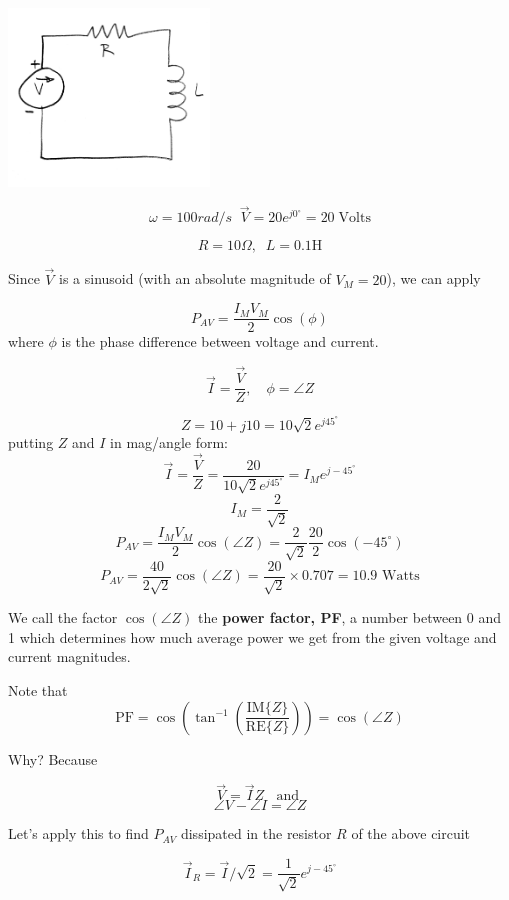 \includegraphics[width=0.4\textwidth]{figsChapt03/TU95372.png}


\[
\omega = 100 rad/s\;\; \vec{V} = 20 e^{j 0^\circ} = 20\; \mathrm{Volts}
\]

\[
R = 10 \Omega,\;\; L = 0.1 \text{H}
\]

\noindent Since $\vec V$ is a sinusoid (with an absolute magnitude of
$V_M=20$), we can apply

\[
P_{AV} = \frac{I_M V_M}{2} \cos(\phi)
\]
where $\phi$ is the phase difference between voltage  and current.

\[
\vec{I} = \frac{\vec{V}}{Z},  \quad \phi = \angle{Z}
\]

\[
Z = 10 + j10 = 10\sqrt{2}e^{j45^\circ}
\]
putting $Z$ and $I$ in mag/angle form:
\[
\vec{I} = \frac{\vec V}{Z} = \frac{20}{10\sqrt{2} e^{j45^\circ}} = I_M e^{j-45^\circ}
\]
\[\boxed{
    I_M=\frac{2}{\sqrt{2}}
  }
\]
\[
P_{AV} = \frac{I_M V_M}{2} \cos(\angle Z) = \frac {2}  {\sqrt{2}} \frac {20}  {2}\cos(-45^\circ)
\]
\[\boxed{
    P_{AV} = \frac {40}  {2\sqrt{2}}\cos(\angle Z)  =  \frac {20}  {\sqrt{2}}\times 0.707 = 10.9 \text{ Watts}
    }
\]


We call the factor $\cos(\angle Z)$ the {\bf power factor, PF}, a number
between 0 and 1 which determines how much average power we get from the
given voltage and current magnitudes.

Note that
\[
\mathrm{PF} = \cos\left(\tan^{-1}\left ( \frac {\mathrm{IM}\{Z\} }  {\mathrm{RE}\{Z\}}  \right ) \right) = \cos\left ( \angle{Z}\right )
\]
%
%
%

\noindent Why?  Because

\[
\vec{V} = \vec{I} Z\;\; \text{ and }
\]
\[
\angle V - \angle I = \angle Z
\]

Let's apply this to
find $P_{AV}$ dissipated in the resistor $R$ of the above circuit

\[
\vec{I}_R = \vec{I}/\sqrt{2} = \frac{1}{\sqrt{2}} e^{j-45^\circ}
\]

